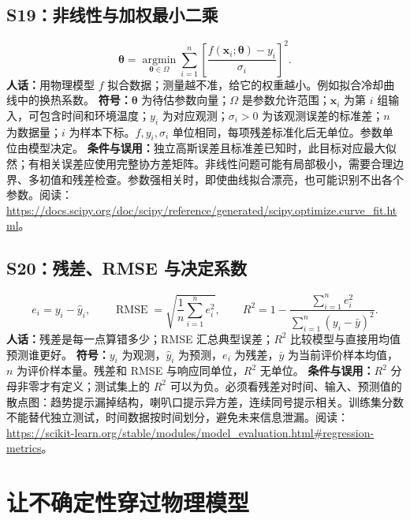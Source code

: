 \documentclass[UTF8,zihao=-4,openany,oneside,fontset=windows]{ctexbook}
\begin{document}
\subsection{S19：非线性与加权最小二乘}
\begin{equation}
 \hat{\boldsymbol\theta}=\underset{\boldsymbol\theta\in\Omega}{\operatorname{argmin}}
 \sum_{i=1}^{n}\left[\frac{f(\mathbf x_i;\boldsymbol\theta)-y_i}{\sigma_i}\right]^2.
\end{equation}
\textbf{人话：}用物理模型 $f$ 拟合数据；测量越不准，给它的权重越小。例如拟合冷却曲线中的换热系数。
\textbf{符号：}$\boldsymbol\theta$ 为待估参数向量；$\Omega$ 是参数允许范围；$\mathbf x_i$ 为第 $i$ 组输入，可包含时间和环境温度；$y_i$ 为对应观测；$\sigma_i>0$ 为该观测误差的标准差；$n$ 为数据量；$i$ 为样本下标。$f,y_i,\sigma_i$ 单位相同，每项残差标准化后无单位。参数单位由模型决定。
\textbf{条件与误用：}独立高斯误差且标准差已知时，此目标对应最大似然；有相关误差应使用完整协方差矩阵。非线性问题可能有局部极小，需要合理边界、多初值和残差检查。参数强相关时，即使曲线拟合漂亮，也可能识别不出各个参数。阅读：\url{https://docs.scipy.org/doc/scipy/reference/generated/scipy.optimize.curve_fit.html}。

\subsection{S20：残差、RMSE 与决定系数}
\begin{equation}
 e_i=y_i-\hat y_i,\qquad
 \operatorname{RMSE}=\sqrt{\frac1n\sum_{i=1}^{n}e_i^2},\qquad
 R^2=1-\frac{\sum_{i=1}^{n}e_i^2}{\sum_{i=1}^{n}(y_i-\bar y)^2}.
\end{equation}
\textbf{人话：}残差是每一点算错多少；RMSE 汇总典型误差；$R^2$ 比较模型与直接用均值预测谁更好。
\textbf{符号：}$y_i$ 为观测，$\hat y_i$ 为预测，$e_i$ 为残差，$\bar y$ 为当前评价样本均值，$n$ 为评价样本量。残差和 RMSE 与响应同单位，$R^2$ 无单位。
\textbf{条件与误用：}$R^2$ 分母非零才有定义；测试集上的 $R^2$ 可以为负。必须看残差对时间、输入、预测值的散点图：趋势提示漏掉结构，喇叭口提示异方差，连续同号提示相关。训练集分数不能替代独立测试，时间数据按时间划分，避免未来信息泄漏。阅读：\url{https://scikit-learn.org/stable/modules/model_evaluation.html#regression-metrics}。

\section{让不确定性穿过物理模型}
\end{document}

